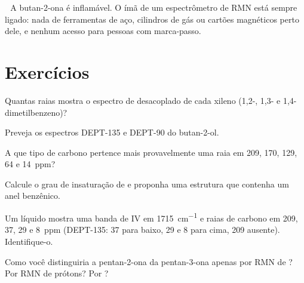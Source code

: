 \begin{safety}{\,\,}
A butan-2-ona é inflamável. O ímã de um espectrômetro de RMN está sempre ligado: nada de ferramentas de
aço, cilindros de gás ou cartões magnéticos perto dele, e nenhum acesso para pessoas com marca-passo.
\end{safety}

\section{Exercícios}

\begin{exercise}[$\star$]\label{exo:b2:structure-determination:1}
Quantas raias mostra o espectro de  desacoplado de cada xileno (1,2-, 1,3- e
1,4-dimetilbenzeno)?
\end{exercise}

\begin{exercise}[$\star$]\label{exo:b2:structure-determination:2}
Preveja os espectros DEPT-135 e DEPT-90 do butan-2-ol.
\end{exercise}

\begin{exercise}[$\star$]\label{exo:b2:structure-determination:3}
A que tipo de carbono pertence mais provavelmente uma raia em 209, 170, 129, 64 e 14~ppm?
\end{exercise}

\begin{exercise}[$\star$]\label{exo:b2:structure-determination:4}
Calcule o grau de insaturação de  e proponha uma estrutura que contenha um anel benzênico.
\end{exercise}

\begin{exercise}[$\star\star$]\label{exo:b2:structure-determination:5}
Um líquido  mostra uma banda de IV em \qty{1715}{cm^{-1}} e raias de carbono em 209, 37, 29 e 8~ppm
(DEPT-135: 37 para baixo, 29 e 8 para cima, 209 ausente). Identifique-o.
\end{exercise}

\begin{exercise}[$\star\star$]\label{exo:b2:structure-determination:6}
Como você distinguiria a pentan-2-ona da pentan-3-ona apenas por RMN de ? Por RMN de prótons?
Por ?
\end{exercise}

